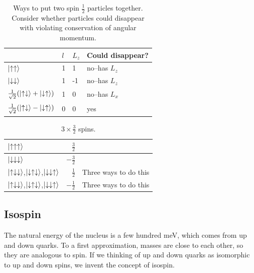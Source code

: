 \documentclass[]{article}
\begin{document}
\begin{table}[H]
	\begin{center}
		\caption[Ways to put two spin $\frac{1}{2}$ particles together]{Ways to put two spin $\frac{1}{2}$ particles together. Consider whether particles could disappear with violating conservation of angular momentum.}
		\begin{tabular}{|l|l|l|l|}\hline
			&$l$&$L_z$&Could disappear?\\ \hline
			$\ket{\uparrow\uparrow}$ &1&1&no--has $L_z$\\ \hline
			$\ket{\downarrow\downarrow}$&1&-1&no--has $L_z$ \\ \hline
			$\frac{1}{\sqrt{2}}(\ket{\uparrow\downarrow}+\ket{\downarrow\uparrow})$ &1&0&no--has $L_x$\\ \hline
			$\frac{1}{\sqrt{2}}(\ket{\uparrow\downarrow}-\ket{\downarrow\uparrow})$ &0&0&yes\\ \hline
		\end{tabular}
	\end{center}
\end{table}


\begin{table}[H]
	\begin{center}
		\caption{$3 \times \frac{3}{2}$ spins.}
		\begin{tabular}{|l|r|c|}\hline
			$\ket{\uparrow\uparrow\uparrow}$&$\frac{3}{2}$& \\ \hline
			$\ket{\downarrow\downarrow\downarrow}$&$-\frac{3}{2}$& \\ \hline
			$\ket{\uparrow\downarrow\downarrow}$,$\ket{\downarrow\uparrow\downarrow}$,$\ket{\downarrow\downarrow\uparrow}$&$\frac{1}{2}$&Three ways to do this\\ \hline
			$\ket{\uparrow\downarrow\downarrow}$,$\ket{\downarrow\uparrow\downarrow}$,$\ket{\downarrow\downarrow\uparrow}$&$-\frac{1}{2}$&Three ways to do this\\ \hline
		\end{tabular}
	\end{center}
\end{table}

\subsection{Isospin}

The natural energy of the nucleus is a few hundred meV, which comes from up and down quarks. To a first approximation, masses are close to each other, so they are analogous to spin. If we thinking of up and down quarks as isomorphic to up and down spins, we invent the concept of isospin.
\end{document}
